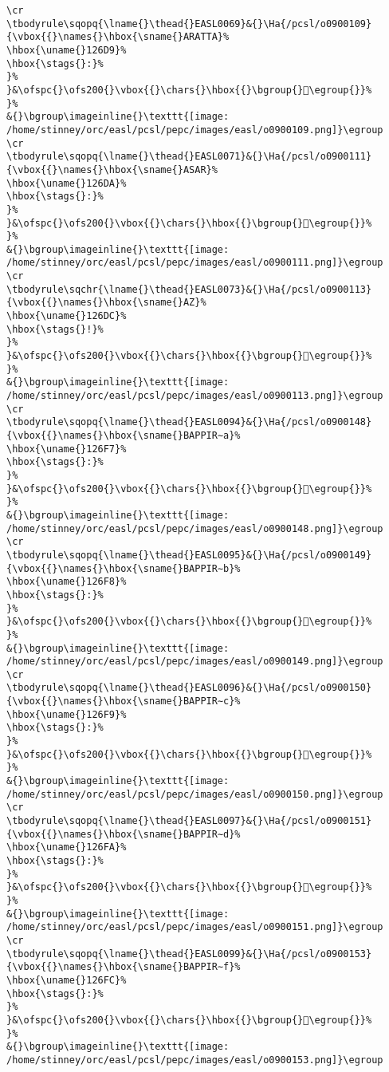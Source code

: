 \begin{verbatim}
\cr
\tbodyrule\sqopq{\lname{}\thead{}EASL0069}&{}\Ha{/pcsl/o0900109}{\vbox{{}\names{}\hbox{\sname{}ARATTA}%
\hbox{\uname{}126D9}%
\hbox{\stags{}:}%
}%
}&\ofspc{}\ofs200{}\vbox{{}\chars{}\hbox{{}\bgroup{}𒛙\egroup{}}%
}%
&{}\bgroup\imageinline{}\texttt{[image: /home/stinney/orc/easl/pcsl/pepc/images/easl/o0900109.png]}\egroup
\cr
\tbodyrule\sqopq{\lname{}\thead{}EASL0071}&{}\Ha{/pcsl/o0900111}{\vbox{{}\names{}\hbox{\sname{}ASAR}%
\hbox{\uname{}126DA}%
\hbox{\stags{}:}%
}%
}&\ofspc{}\ofs200{}\vbox{{}\chars{}\hbox{{}\bgroup{}𒛚\egroup{}}%
}%
&{}\bgroup\imageinline{}\texttt{[image: /home/stinney/orc/easl/pcsl/pepc/images/easl/o0900111.png]}\egroup
\cr
\tbodyrule\sqchr{\lname{}\thead{}EASL0073}&{}\Ha{/pcsl/o0900113}{\vbox{{}\names{}\hbox{\sname{}AZ}%
\hbox{\uname{}126DC}%
\hbox{\stags{}!}%
}%
}&\ofspc{}\ofs200{}\vbox{{}\chars{}\hbox{{}\bgroup{}𒛜\egroup{}}%
}%
&{}\bgroup\imageinline{}\texttt{[image: /home/stinney/orc/easl/pcsl/pepc/images/easl/o0900113.png]}\egroup
\cr
\tbodyrule\sqopq{\lname{}\thead{}EASL0094}&{}\Ha{/pcsl/o0900148}{\vbox{{}\names{}\hbox{\sname{}BAPPIR∼a}%
\hbox{\uname{}126F7}%
\hbox{\stags{}:}%
}%
}&\ofspc{}\ofs200{}\vbox{{}\chars{}\hbox{{}\bgroup{}𒛷\egroup{}}%
}%
&{}\bgroup\imageinline{}\texttt{[image: /home/stinney/orc/easl/pcsl/pepc/images/easl/o0900148.png]}\egroup
\cr
\tbodyrule\sqopq{\lname{}\thead{}EASL0095}&{}\Ha{/pcsl/o0900149}{\vbox{{}\names{}\hbox{\sname{}BAPPIR∼b}%
\hbox{\uname{}126F8}%
\hbox{\stags{}:}%
}%
}&\ofspc{}\ofs200{}\vbox{{}\chars{}\hbox{{}\bgroup{}𒛸\egroup{}}%
}%
&{}\bgroup\imageinline{}\texttt{[image: /home/stinney/orc/easl/pcsl/pepc/images/easl/o0900149.png]}\egroup
\cr
\tbodyrule\sqopq{\lname{}\thead{}EASL0096}&{}\Ha{/pcsl/o0900150}{\vbox{{}\names{}\hbox{\sname{}BAPPIR∼c}%
\hbox{\uname{}126F9}%
\hbox{\stags{}:}%
}%
}&\ofspc{}\ofs200{}\vbox{{}\chars{}\hbox{{}\bgroup{}𒛹\egroup{}}%
}%
&{}\bgroup\imageinline{}\texttt{[image: /home/stinney/orc/easl/pcsl/pepc/images/easl/o0900150.png]}\egroup
\cr
\tbodyrule\sqopq{\lname{}\thead{}EASL0097}&{}\Ha{/pcsl/o0900151}{\vbox{{}\names{}\hbox{\sname{}BAPPIR∼d}%
\hbox{\uname{}126FA}%
\hbox{\stags{}:}%
}%
}&\ofspc{}\ofs200{}\vbox{{}\chars{}\hbox{{}\bgroup{}𒛺\egroup{}}%
}%
&{}\bgroup\imageinline{}\texttt{[image: /home/stinney/orc/easl/pcsl/pepc/images/easl/o0900151.png]}\egroup
\cr
\tbodyrule\sqopq{\lname{}\thead{}EASL0099}&{}\Ha{/pcsl/o0900153}{\vbox{{}\names{}\hbox{\sname{}BAPPIR∼f}%
\hbox{\uname{}126FC}%
\hbox{\stags{}:}%
}%
}&\ofspc{}\ofs200{}\vbox{{}\chars{}\hbox{{}\bgroup{}𒛼\egroup{}}%
}%
&{}\bgroup\imageinline{}\texttt{[image: /home/stinney/orc/easl/pcsl/pepc/images/easl/o0900153.png]}\egroup

\end{verbatim}

